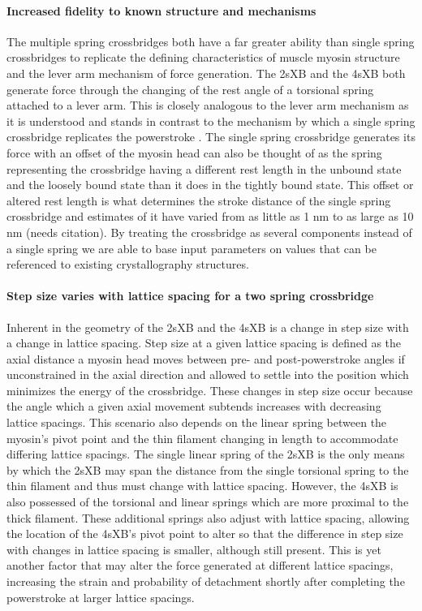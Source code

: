 \documentclass[]{article}
\begin{document}
\paragraph{Increased fidelity to known structure and mechanisms} %
The multiple spring crossbridges both have a far greater ability than single spring crossbridges to replicate the defining characteristics of muscle myosin structure and the lever arm mechanism of force generation. 
The 2sXB and the 4sXB both generate force through the changing of the rest angle of a torsional spring attached to a lever arm.
This is closely analogous to the lever arm mechanism as it is understood and stands in contrast to the mechanism by which a single spring crossbridge replicates the powerstroke \citep{Houdusse:2001:p182}.
The single spring crossbridge generates its force with an offset of the myosin head can also be thought of as the spring representing the crossbridge having a different rest length in the unbound state and the loosely bound state than it does in the tightly bound state. 
This offset or altered rest length is what determines the stroke distance of the single spring crossbridge and estimates of it have varied from as little as 1 nm to as large as 10 nm (needs citation). 
By treating the crossbridge as several components instead of a single spring we are able to base input parameters on values that can be referenced to existing crystallography structures.

\paragraph{Step size varies with lattice spacing for a two spring crossbridge} %
Inherent in the geometry of the 2sXB and the 4sXB is a change in step size with a change in lattice spacing.
Step size at a given lattice spacing is defined as the axial distance a myosin head moves between pre- and post-powerstroke angles if unconstrained in the axial direction and allowed to settle into the position which minimizes the energy of the crossbridge.
These changes in step size occur because the angle which a given axial movement subtends increases with decreasing lattice spacings.
This scenario also depends on the linear spring between the myosin's pivot point and the thin filament changing in length to accommodate differing lattice spacings.
The single linear spring of the 2sXB is the only means by which the 2sXB may span the distance from the single torsional spring to the thin filament and thus must change with lattice spacing.
However, the 4sXB is also possessed of the torsional and linear springs which are more proximal to the thick filament.
These additional springs also adjust with lattice spacing, allowing the location of the 4sXB's pivot point to alter so that the difference in step size with changes in lattice spacing is smaller, although still present.
This is yet another factor that may alter the force generated at different lattice spacings, increasing the strain and probability of detachment shortly after completing the powerstroke at larger lattice spacings.
\end{document}
